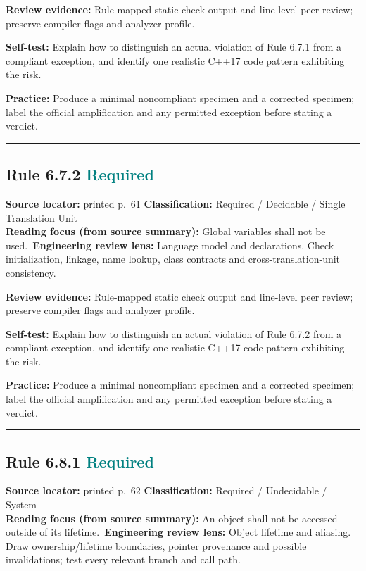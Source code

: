 \documentclass[10pt,letterpaper]{article}
\begin{document}
\textbf{Review evidence:} Rule-mapped static check output and line-level peer review; preserve compiler flags and analyzer profile.

\textbf{Self-test:} Explain how to distinguish an actual violation of Rule 6.7.1 from a compliant exception, and identify one realistic C++17 code pattern exhibiting the risk.\par
\textbf{Practice:} Produce a minimal noncompliant specimen and a corrected specimen; label the official amplification and any permitted exception before stating a verdict.
\smallskip\hrule\smallskip
\subsection*{Rule 6.7.2 \enspace \texorpdfstring{\small\textcolor{teal}{Required}}{Required}}
\noindent\textbf{Source locator:} printed p.~61 \quad\textbf{Classification:} Required / Decidable / Single Translation Unit\\
\textbf{Reading focus (from source summary):} Global variables shall not be used.\
\textbf{Engineering review lens:} Language model and declarations. Check initialization, linkage, name lookup, class contracts and cross-translation-unit consistency.

\textbf{Review evidence:} Rule-mapped static check output and line-level peer review; preserve compiler flags and analyzer profile.

\textbf{Self-test:} Explain how to distinguish an actual violation of Rule 6.7.2 from a compliant exception, and identify one realistic C++17 code pattern exhibiting the risk.\par
\textbf{Practice:} Produce a minimal noncompliant specimen and a corrected specimen; label the official amplification and any permitted exception before stating a verdict.
\smallskip\hrule\smallskip
\subsection*{Rule 6.8.1 \enspace \texorpdfstring{\small\textcolor{teal}{Required}}{Required}}
\noindent\textbf{Source locator:} printed p.~62 \quad\textbf{Classification:} Required / Undecidable / System\\
\textbf{Reading focus (from source summary):} An object shall not be accessed outside of its lifetime.\
\textbf{Engineering review lens:} Object lifetime and aliasing. Draw ownership/lifetime boundaries, pointer provenance and possible invalidations; test every relevant branch and call path.
\end{document}
